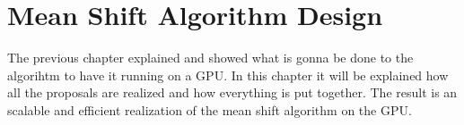 
\chapter{Mean Shift Algorithm Design} %
\label{cha:algorithm_design}
The previous chapter explained and showed what is gonna be done to the algorihtm
to have it running on a \gls{GPU}. In this chapter it will be explained how all
the proposals are realized and how everything is put together. The result is an
scalable and efficient realization of the mean shift algorithm on the \gls{GPU}.





